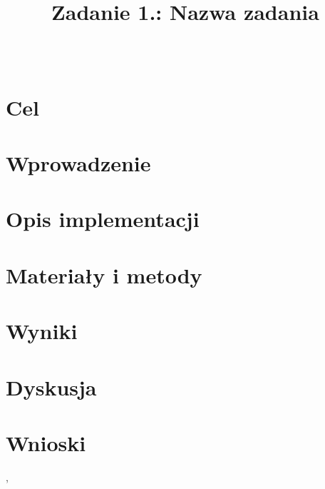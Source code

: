 \documentclass{classrep}
\author{%
  \studentinfo[216806@edu.p.lodz.pl]{Kamil Kowalewski}{216806}\\
  \studentinfo[216920@edu.p.lodz.pl]{Tomasz Witczak}{216920}%
}
\title{Zadanie 1.: Nazwa zadania}
\begin{document}
\maketitle
\thispagestyle{fancyplain}

\section{Cel}
{

}

\section{Wprowadzenie}
{

}

\section{Opis implementacji}
{

}

\section{Materiały i metody}
{

}

\section{Wyniki}
{

}

\section{Dyskusja}
{

}

\section{Wnioski}
{

}

\begin{thebibliography}{0}
    \textsl{ }, 

\end{thebibliography}

{

}
\end{document}
